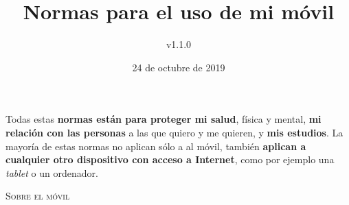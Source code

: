 \documentclass[12pt]{article}
\title{Normas para el uso de mi móvil}
\author{v1.1.0}
\date{24 de octubre de 2019}
\begin{document}
\setlength{\droptitle}{-25mm}

\maketitle

Todas estas \textbf{normas están para proteger mi salud}, física y
mental, \textbf{mi relación con las personas} a las que quiero y me quieren, y
\textbf{mis estudios}. La mayoría de estas normas no aplican sólo a al
móvil, también \textbf{aplican a cualquier otro dispositivo con acceso
  a Internet}, como por ejemplo una \emph{tablet} o un ordenador.

\begin{center}
  \textsc{Sobre el móvil}
\end{center}
\end{document}
